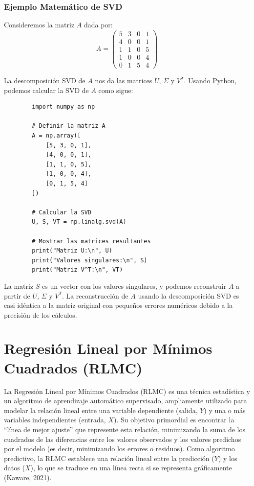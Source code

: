 \documentclass[12pt]{article}
\begin{document}
        \subsubsection*{Ejemplo Matemático de SVD}
        
        Consideremos la matriz $A$ dada por:
        \[
        A = \begin{pmatrix}
        5 & 3 & 0 & 1 \\
        4 & 0 & 0 & 1 \\
        1 & 1 & 0 & 5 \\
        1 & 0 & 0 & 4 \\
        0 & 1 & 5 & 4
        \end{pmatrix}
        \]
        
        La descomposición SVD de $A$ nos da las matrices $U$, $\Sigma$ y $V^T$. Usando Python, podemos calcular la SVD de $A$ como sigue:
        \begin{verbatim}
        import numpy as np
        
        # Definir la matriz A
        A = np.array([
            [5, 3, 0, 1],
            [4, 0, 0, 1],
            [1, 1, 0, 5],
            [1, 0, 0, 4],
            [0, 1, 5, 4]
        ])
        
        # Calcular la SVD
        U, S, VT = np.linalg.svd(A)
        
        # Mostrar las matrices resultantes
        print("Matriz U:\n", U)
        print("Valores singulares:\n", S)
        print("Matriz V^T:\n", VT)
        \end{verbatim}
        
        La matriz $S$ es un vector con los valores singulares, y podemos reconstruir $A$ a partir de $U$, $\Sigma$ y $V^T$. La reconstrucción de $A$ usando la descomposición SVD es casi idéntica a la matriz original con pequeños errores numéricos debido a la precisión de los cálculos.
        
        \section*{Regresión Lineal por Mínimos Cuadrados (RLMC)}
        \noindent
        La Regresión Lineal por Mínimos Cuadrados (RLMC) es una técnica estadística y un algoritmo de aprendizaje automático supervisado, ampliamente utilizado para modelar la relación lineal entre una variable dependiente (salida, $Y$) y una o más variables independientes (entrada, $X$). Su objetivo primordial es encontrar la “línea de mejor ajuste” que represente esta relación, minimizando la suma de los cuadrados de las diferencias entre los valores observados y los valores predichos por el modelo (es decir, minimizando los errores o residuos). Como algoritmo predictivo, la RLMC establece una relación lineal entre la predicción ($Y$) y los datos ($X$), lo que se traduce en una línea recta si se representa gráficamente (Kaware, 2021).
        
\end{document}
